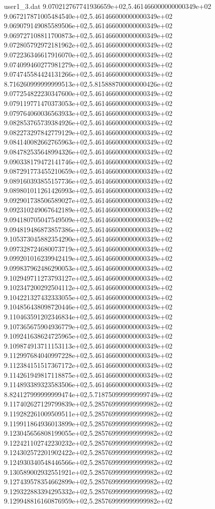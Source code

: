 \begin{filecontents}{user1_3.dat}
9.070212767741936659e+02,5.461466000000000349e+02
9.067217871005484540e+02,5.461466000000000349e+02
9.069079149085589506e+02,5.461466000000000349e+02
9.069727108811700873e+02,5.461466000000000349e+02
9.072805792972181962e+02,5.461466000000000349e+02
9.072236346617916070e+02,5.461466000000000349e+02
9.074099460277981279e+02,5.461466000000000349e+02
9.074745584424131266e+02,5.461466000000000349e+02
8.716260999999999513e+02,5.815888700000000426e+02
9.077254822230347600e+02,5.461466000000000349e+02
9.079119771470373053e+02,5.461466000000000349e+02
9.079764060036563933e+02,5.461466000000000349e+02
9.082853765739384926e+02,5.461466000000000349e+02
9.082273297842779129e+02,5.461466000000000349e+02
9.084140082662765963e+02,5.461466000000000349e+02
9.084782535648994326e+02,5.461466000000000349e+02
9.090338179472141746e+02,5.461466000000000349e+02
9.087291773455210659e+02,5.461466000000000349e+02
9.089160393855157736e+02,5.461466000000000349e+02
9.089801011261426993e+02,5.461466000000000349e+02
9.092901738506589027e+02,5.461466000000000349e+02
9.092310249067642189e+02,5.461466000000000349e+02
9.094180705047549509e+02,5.461466000000000349e+02
9.094819486873857386e+02,5.461466000000000349e+02
9.105373045882354290e+02,5.461466000000000349e+02
9.097328724680073719e+02,5.461466000000000349e+02
9.099201016239942419e+02,5.461466000000000349e+02
9.099837962486290053e+02,5.461466000000000349e+02
9.102949711273793127e+02,5.461466000000000349e+02
9.102347200292504112e+02,5.461466000000000349e+02
9.104221327432333055e+02,5.461466000000000349e+02
9.104856438098720446e+02,5.461466000000000349e+02
9.110463591202346834e+02,5.461466000000000349e+02
9.107365675904936779e+02,5.461466000000000349e+02
9.109241638624725965e+02,5.461466000000000349e+02
9.109874913711153113e+02,5.461466000000000349e+02
9.112997684040997228e+02,5.461466000000000349e+02
9.112384151517367172e+02,5.461466000000000349e+02
9.114261949817118875e+02,5.461466000000000349e+02
9.114893389323583506e+02,5.461466000000000349e+02
8.824127999999999474e+02,5.718750999999999749e+02
9.117402627129799839e+02,5.285769999999999982e+02
9.119282261009509511e+02,5.285769999999999982e+02
9.119911864936013899e+02,5.285769999999999982e+02
9.123045656808199055e+02,5.285769999999999982e+02
9.122421102742230232e+02,5.285769999999999982e+02
9.124302572201902422e+02,5.285769999999999982e+02
9.124930340548446566e+02,5.285769999999999982e+02
9.130589002932551921e+02,5.285769999999999982e+02
9.127439578354662899e+02,5.285769999999999982e+02
9.129322883394295332e+02,5.285769999999999982e+02
9.129948816160876959e+02,5.285769999999999982e+02

\end{filecontents}
